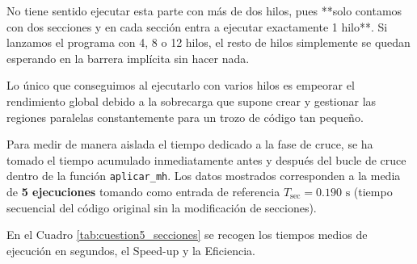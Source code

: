 \documentclass[12pt]{article}
\begin{document}
\begin{enumerate}
No tiene sentido ejecutar esta parte con más de dos hilos, pues **solo contamos con dos secciones y en cada sección entra a ejecutar exactamente 1 hilo**. Si lanzamos el programa con 4, 8 o 12 hilos, el resto de hilos simplemente se quedan esperando en la barrera implícita sin hacer nada. 

Lo único que conseguimos al ejecutarlo con varios hilos es empeorar el rendimiento global debido a la sobrecarga que supone crear y gestionar las regiones paralelas constantemente para un trozo de código tan pequeño.




Para medir de manera aislada el tiempo dedicado a la fase de cruce, se ha tomado el tiempo acumulado inmediatamente antes y después del bucle de cruce dentro de la función \texttt{aplicar\_mh}. Los datos mostrados corresponden a la media de \textbf{5 ejecuciones} tomando como entrada de referencia $T_{\text{sec}} = 0.190\text{ s}$ (tiempo secuencial del código original sin la modificación de secciones).


En el Cuadro \ref{tab:cuestion5_secciones} se recogen los tiempos medios de ejecución en segundos, el Speed-up y la Eficiencia.


\end{enumerate}
\end{document}
